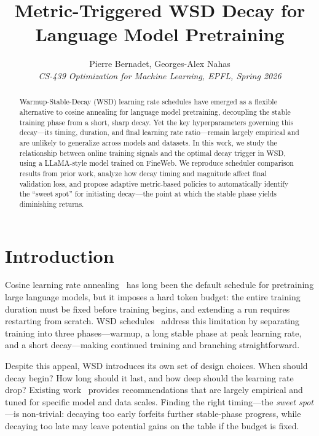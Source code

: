 \documentclass[10pt,conference,compsocconf]{IEEEtran}
\begin{document}
\title{Metric-Triggered WSD Decay for Language Model Pretraining}

\author{
  Pierre Bernadet, Georges-Alex Nahas\\
  \textit{CS-439 Optimization for Machine Learning, EPFL, Spring 2026}
}

\maketitle

\begin{abstract}
  Warmup-Stable-Decay (WSD) learning rate schedules have emerged as a flexible
  alternative to cosine annealing for language model pretraining, decoupling the
  stable training phase from a short, sharp decay. Yet the key hyperparameters
  governing this decay—its timing, duration, and final learning rate ratio—remain
  largely empirical and are unlikely to generalize across models and datasets.
  In this work, we study the relationship between online training signals and the optimal decay
  trigger in WSD, using a LLaMA-style model trained on FineWeb.
  We reproduce scheduler comparison results from prior work, analyze how decay
  timing and magnitude affect final validation loss, and propose adaptive
  metric-based policies to automatically identify the ``sweet spot'' for
  initiating decay—the point at which the stable phase yields diminishing returns.
\end{abstract}


\section{Introduction}

Cosine learning rate annealing~\cite{kaplan2020scaling} has long been the
default schedule for pretraining large language models, but it imposes a hard
token budget: the entire training duration must be fixed before training begins,
and extending a run requires restarting from scratch. WSD
schedules~\cite{minicpm} address this limitation by separating training into
three phases—warmup, a long stable phase at peak learning rate, and a short
decay—making continued training and branching straightforward.

Despite this appeal, WSD introduces its own set of design choices. When should
decay begin? How long should it last, and how deep should the learning rate
drop? Existing work~\cite{minicpm,wen2024river} provides recommendations that
are largely empirical and tuned for specific model and data scales. Finding the
right timing—the \emph{sweet spot}—is non-trivial: decaying too early
forfeits further stable-phase progress, while decaying too late may leave
potential gains on the table if the budget is fixed.
\end{document}
